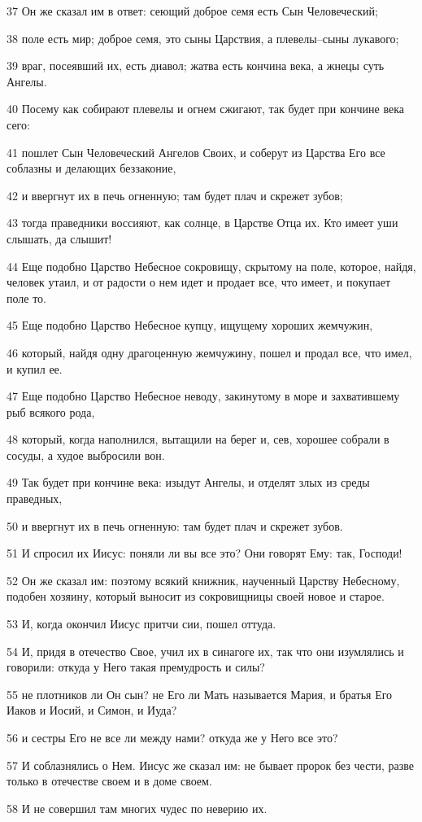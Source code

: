 \par 37 Он же сказал им в ответ: сеющий доброе семя есть Сын Человеческий;
\par 38 поле есть мир; доброе семя, это сыны Царствия, а плевелы--сыны лукавого;
\par 39 враг, посеявший их, есть диавол; жатва есть кончина века, а жнецы суть Ангелы.
\par 40 Посему как собирают плевелы и огнем сжигают, так будет при кончине века сего:
\par 41 пошлет Сын Человеческий Ангелов Своих, и соберут из Царства Его все соблазны и делающих беззаконие,
\par 42 и ввергнут их в печь огненную; там будет плач и скрежет зубов;
\par 43 тогда праведники воссияют, как солнце, в Царстве Отца их. Кто имеет уши слышать, да слышит!
\par 44 Еще подобно Царство Небесное сокровищу, скрытому на поле, которое, найдя, человек утаил, и от радости о нем идет и продает все, что имеет, и покупает поле то.
\par 45 Еще подобно Царство Небесное купцу, ищущему хороших жемчужин,
\par 46 который, найдя одну драгоценную жемчужину, пошел и продал все, что имел, и купил ее.
\par 47 Еще подобно Царство Небесное неводу, закинутому в море и захватившему рыб всякого рода,
\par 48 который, когда наполнился, вытащили на берег и, сев, хорошее собрали в сосуды, а худое выбросили вон.
\par 49 Так будет при кончине века: изыдут Ангелы, и отделят злых из среды праведных,
\par 50 и ввергнут их в печь огненную: там будет плач и скрежет зубов.
\par 51 И спросил их Иисус: поняли ли вы все это? Они говорят Ему: так, Господи!
\par 52 Он же сказал им: поэтому всякий книжник, наученный Царству Небесному, подобен хозяину, который выносит из сокровищницы своей новое и старое.
\par 53 И, когда окончил Иисус притчи сии, пошел оттуда.
\par 54 И, придя в отечество Свое, учил их в синагоге их, так что они изумлялись и говорили: откуда у Него такая премудрость и силы?
\par 55 не плотников ли Он сын? не Его ли Мать называется Мария, и братья Его Иаков и Иосий, и Симон, и Иуда?
\par 56 и сестры Его не все ли между нами? откуда же у Него все это?
\par 57 И соблазнялись о Нем. Иисус же сказал им: не бывает пророк без чести, разве только в отечестве своем и в доме своем.
\par 58 И не совершил там многих чудес по неверию их.

